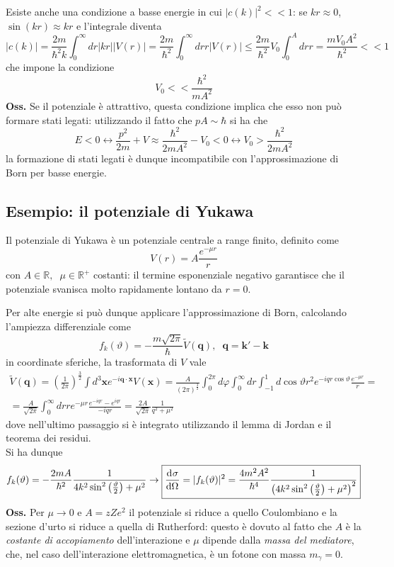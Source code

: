
Esiste anche una condizione a basse energie in cui $|c(k)|^2<<1$: se $kr\approx0$,
$\sin(kr)\approx kr$ e l'integrale diventa
$$|c(k)| = \frac{2m}{\hbar^2k}\int_{0}^{\infty}dr|kr||V(r)| = \frac{2m}{\hbar^2}\int_{0}^{\infty}dr
r|V(r)|\leq\frac{2m}{\hbar^2}V_0\int_{0}^{A}dr r = \frac{mV_0A^2}{\hbar^2}<<1
$$
che impone la condizione
$$V_0<<\frac{\hbar^2}{mA^2}$$
\textbf{Oss.} Se il potenziale è attrattivo, questa condizione implica che esso non può
formare stati legati: utilizzando il fatto che $pA\sim\hbar$ si ha che
$$E<0\leftrightarrow \frac{p^2}{2m}+V \approx \frac{\hbar^2}{2mA^2}-V_0<0 \leftrightarrow
V_0 > \frac{\hbar^2}{2mA^2}$$
la formazione di stati legati è dunque incompatibile con l'approssimazione di Born per basse energie.
\subsection{Esempio: il potenziale di Yukawa}
Il potenziale di Yukawa è un potenziale centrale a range finito, definito come
$$V(r)=A\frac{e^{-\mu r}}{r}$$
con $A\in\mathbb{R},\phantom{x}\mu\in\mathbb{R}^+$ costanti: il termine esponenziale negativo
garantisce che il potenziale svanisca molto rapidamente lontano da $r=0$.

Per alte energie si può dunque applicare l'approssimazione di Born, calcolando l'ampiezza
differenziale come
$$f_k(\vartheta) = -\frac{m\sqrt{2\pi}}{\hbar}\tilde V(\mathbf{q}),\phantom{x}\mathbf{q}=
\mathbf{k'}-\mathbf{k}$$
in coordinate sferiche, la trasformata di $V$ vale
\begin{gather*}
\tilde V(\mathbf{q}) = \left(\frac{1}{2\pi}\right)^{\frac{3}{2}}\int d^3\mathbf{x}
e^{-i\mathbf{q}\cdot\mathbf{x}}V(\mathbf{x}) = \frac{A}{\left(2\pi\right)^{\frac{3}{2}}}
\int_{0}^{2\pi}d\varphi\int_{0}^{\infty}dr\int_{-1}^{1}d\cos\vartheta r^2 e^{-iqr\cos\vartheta}
\frac{e^{-\mu r}}{r}=\\
=\frac{A}{\sqrt{2\pi}}\int_{0}^{\infty}dr re^{-\mu r}\frac{e^{-iqr}-e^{iqr}}{-iqr} =
\frac{2A}{\sqrt{2\pi}} \frac{1}{q^2+\mu^2}
\end{gather*}
dove nell'ultimo passaggio si è integrato utilizzando il lemma di Jordan e il teorema dei residui.\\
Si ha dunque
$$f_k(\vartheta) = -\frac{2mA}{\hbar^2}\frac{1}{4k^2\sin^2\left(\frac{\vartheta}{2}\right)+\mu^2}
\rightarrow \boxed{\dv[]{\sigma}{\Omega}(\vartheta) = |f_k(\vartheta)|^2 = \frac{4m^2A^2}{\hbar^4}
\frac{1}{\left(4k^2\sin^2\left(\frac{\vartheta}{2}\right)+\mu^2\right)^2}}$$
\textbf{Oss.} Per $\mu\to0$ e $A=zZe^2$ il potenziale si riduce a quello Coulombiano
e la sezione d'urto si riduce a quella di Rutherford: questo è dovuto al fatto che $A$ è la
\textit{costante di accopiamento} dell'interazione e $\mu$ dipende dalla \textit{massa del mediatore},
che, nel caso dell'interazione elettromagnetica, è un fotone con massa $m_\gamma=0$.
